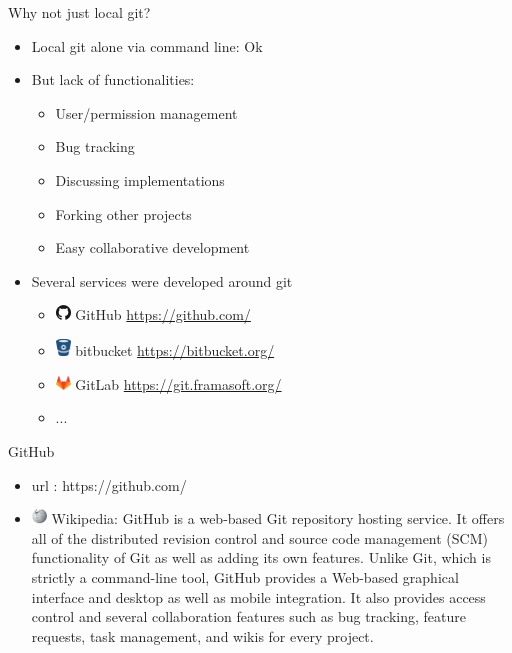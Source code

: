 \def\git#1{{\small\color{git}\$ git #1}\\}

\begin{frame}[fragile]{Why not just local git?}
  \begin{itemize}
  \item<1-> Local git alone via command line: Ok
  \item<2-> But lack of functionalities:
    \begin{itemize}
    \item User/permission management
    \item Bug tracking
    \item Discussing implementations
    \item Forking other projects
    \item Easy collaborative development 
    \end{itemize}
  \item<3-> Several services were developed around git
    \begin{itemize}
    \item \includegraphics[width=15px]{images/GitHub-Mark.png} GitHub \url{https://github.com/}
    \item \includegraphics[width=15px]{images/bitbucket.png} bitbucket \url{https://bitbucket.org/}
    \item \includegraphics[width=15px]{images/GitLab_Logo.png} GitLab \url{https://git.framasoft.org/}
    \item ...
    \end{itemize}
  \end{itemize}
\end{frame}

\begin{frame}{GitHub}
  \begin{itemize}
  \item url : https://github.com/ 
  \item \includegraphics[width=15px]{images/Wikipedia_logo.png} Wikipedia: GitHub is a web-based Git repository hosting service. It offers all of the distributed revision control and source code management (SCM) functionality of Git as well as adding its own features. Unlike Git, which is strictly a command-line tool, GitHub provides a Web-based graphical interface and desktop as well as mobile integration. It also provides access control and several collaboration features such as bug tracking, feature requests, task management, and wikis for every project.
  \end{itemize}
\end{frame}

